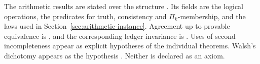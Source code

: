 The arithmetic results are stated over the structure . Its fields are the logical operations, the predicates for truth, consistency and $\Pi_k$-membership, and the laws used in Section~\ref{sec:arithmetic-instance}. Agreement up to provable equivalence is , and the corresponding ledger invariance is . Uses of second incompleteness appear as explicit hypotheses of the individual theorems. Walsh's dichotomy appears as the hypothesis . Neither is declared as an axiom.
